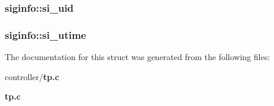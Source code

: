 \subsubsection[{si\_\-uid}]{ {\bf siginfo::si\_\-uid}}\label{structsiginfo_aa73498edf7082bbee1c28aa21d348eb0}
\subsubsection[{si\_\-utime}]{ {\bf siginfo::si\_\-utime}}\label{structsiginfo_a864e2b8e0acbdef640abc7d475ed8459}


The documentation for this struct was generated from the following files:\begin{DoxyCompactItemize}
\item 
controller/{\bf tp.c}\item 
{\bf tp.c}\end{DoxyCompactItemize}
